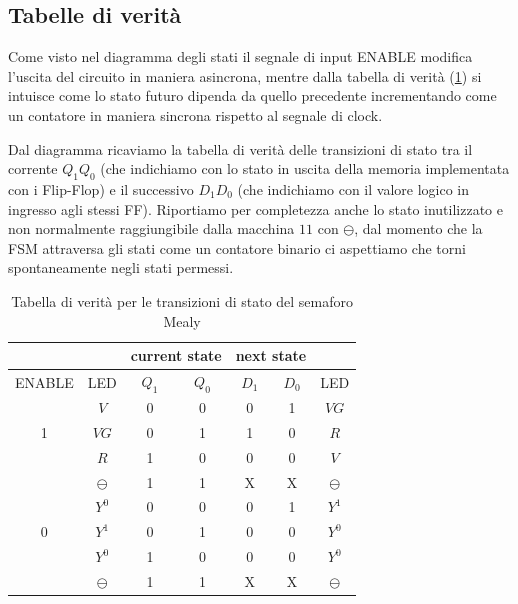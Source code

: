 \documentclass[10pt, a4paper, italian]{article}
\begin{document}
\subsection{Tabelle di verità}
Come visto nel diagramma degli stati il segnale di input ENABLE modifica
l'uscita del circuito in maniera asincrona, mentre dalla tabella di verità
(\cref{tab: semftruth}) si intuisce come lo stato futuro dipenda da quello
precedente incrementando come un contatore in maniera sincrona rispetto al
segnale di clock.

Dal diagramma ricaviamo la tabella di verità delle transizioni di stato tra
il corrente $Q_1 Q_0$ (che indichiamo con lo stato in uscita della memoria
implementata con i Flip-Flop) e il successivo $D_1 D_0$ (che indichiamo con il
valore logico in ingresso agli stessi FF). Riportiamo per completezza anche lo
stato inutilizzato e non normalmente raggiungibile dalla macchina $11$ con
$\ominus$, dal momento che la FSM attraversa gli stati come un contatore
binario ci aspettiamo che torni spontaneamente negli stati permessi.
\begin{table}[htbp]
    \centering
    \begin{tabular}{c|c|cc|cc|c}
    &\multicolumn{1}{c}{ }&\multicolumn{2}{c|}{current state} &
    \multicolumn{2}{c}{next state}\\
     \hline
         ENABLE& LED & $Q_1$ & $Q_0$ & $D_1$ & $D_0$ & LED \\
         \hline
       & $V$ & 0 & 0 & 0 & 1 & $VG$ \\
       1 & $VG$ & 0 & 1 & 1 & 0 & $R$ \\
       & $R$ & 1 & 0 & 0 & 0 & $V$ \\
        & $\ominus$ & 1 & 1 & X & X & $\ominus$\\
        \hline
        & $Y^0$ & 0 & 0 & 0 & 1 & $Y^1$ \\
        0 & $Y^1$ & 0 & 1 & 0 & 0 & $Y^0$ \\
         & $Y^0$ & 1 & 0 & 0 & 0& $Y^0$ \\
         &  $\ominus$ & 1 & 1 & X & X & $\ominus$ \\
    \end{tabular}
    \caption{Tabella di verità per le transizioni di stato del semaforo Mealy}
    \label{tab: semftruth}
\end{table}
\end{document}
